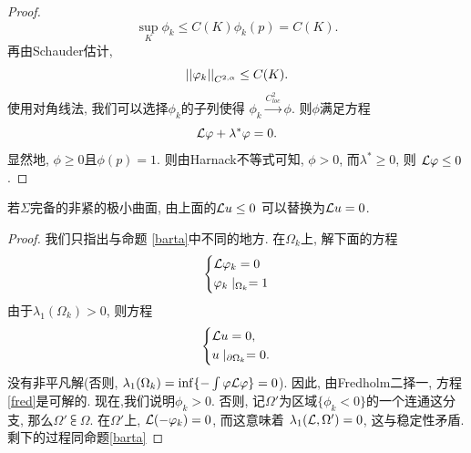 \begin{proof}
    \begin{equation}
        \sup_K \phi_k \le C(K)\phi_k(p)=C(K).
    \end{equation}
    再由Schauder估计,
    \begin{equation}
        {\left | \left | \varphi_k \right | \right |}_{C^{2,\alpha}} \le C(K).
    \end{equation}
    使用对角线法, 我们可以选择$\phi_k$的子列使得 $\phi_k \overset{C^2_{loc}}{\longrightarrow} \phi $. 则$\phi$满足方程
    \begin{equation}
        \mathcal{L} \varphi + \lambda^* \varphi =0.
    \end{equation}
    显然地, $\phi \ge 0$且$\phi(p)=1$. 则由Harnack不等式可知,  $\phi >0$, 而$\lambda^* \ge 0$, 则 $\mathcal{L}\varphi \le 0$.
\end{proof}
\begin{corollary}
    若$\Sigma$完备的非紧的极小曲面, 由上面的$\mathcal{L} u \le 0$ 可以替换为$\mathcal{L} u =0$.
\end{corollary}
\begin{proof}
    我们只指出与命题 \eqref{barta}中不同的地方.  在$\Omega_k$上,  解下面的方程
    \begin{equation} \label{fred}
        \left\{
            \begin{aligned}
                &\mathcal{L} \varphi_k=0 \\
                &\varphi_k\mid _{\Omega_k} =1 
            \end{aligned}
        \right.
    \end{equation}
    由于$\lambda_1(\Omega_k)>0$, 则方程
    \begin{equation}
        \left\{
        \begin{aligned}
            &\mathcal{L} u=0, \\
            &u\mid_{\partial \Omega_k}=0.
        \end{aligned}
        \right.
    \end{equation}
    没有非平凡解(否则, $\lambda_1(\Omega_k)=\inf\{ -\int\varphi\mathcal{L} \varphi \}=0$). 因此, 由Fredholm二择一, 方程\eqref{fred}是可解的.  现在,我们说明$\phi_k >0$. 否则, 记$\Omega'$为区域$\{\phi_k <0\}$的一个连通这分支, 那么$\Omega' \subsub \Omega$. 在$\Omega'$上, $\mathcal{L} (-\varphi_k)=0$, 而这意味着 $\lambda_1(\mathcal{L}, \Omega') =0$, 这与稳定性矛盾.  剩下的过程同命题\eqref{barta}
\end{proof}


